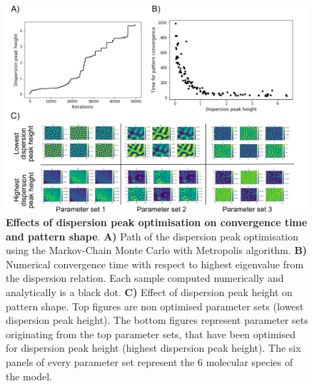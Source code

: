 \begin{figure}[H] %
    \centering
    \includegraphics[width=1\textwidth]{chapters/Chapter 1/dispersion_peak_optimisation} %
    \caption{\textbf{Effects of dispersion peak optimisation on convergence time and pattern shape}. \textbf{A)} Path of the dispersion peak optimisation using the Markov-Chain Monte Carlo with Metropolis algorithm. \textbf{B)} Numerical convergence time with respect to highest eigenvalue from the dispersion relation. Each sample computed numerically and analytically is a black dot. \textbf{C)} Effect of dispersion peak height on pattern shape. Top figures are non optimised parameter sets (lowest dispersion peak height). The bottom figures represent parameter sets originating from the top parameter sets, that have been optimised for dispersion peak height (highest dispersion peak height). The six panels of every parameter set represent the 6 molecular species of the model.}
    \label{fig:dispersion_peak_optimisation} %
\end{figure}



